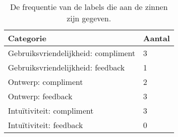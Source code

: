 \documentclass[../research.tex]{subfiles}
\begin{document}
\begin{table}
  \centering
  \begin{tabular}{@{}ll@{}}
    \toprule
    Categorie                           & Aantal \\ \midrule
    Gebruiksvriendelijkheid: compliment & 3      \\
    Gebruiksvriendelijkheid: feedback   & 1      \\
    Ontwerp: compliment                 & 2      \\
    Ontwerp: feedback                   & 3      \\
    Intuïtiviteit: compliment           & 3      \\
    Intuïtiviteit: feedback             & 0      \\
    \bottomrule
  \end{tabular}
  \caption{De frequentie van de labels die aan de zinnen zijn gegeven.}
  \label{tab:labels}
\end{table}
\end{document}
